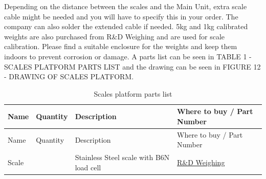 \documentclass[
  letterpaper,
]{scrbook}
\begin{document}
Depending on the distance between the scales and the Main Unit, extra
scale cable might be needed and you will have to specify this in your
order. The company can also solder the extended cable if needed. 5kg and
1kg calibrated weights are also purchased from R\&D Weighing and are
used for scale calibration. Please find a suitable enclosure for the
weights and keep them indoors to prevent corrosion or damage. A parts
list can be seen in TABLE 1 - SCALES PLATFORM PARTS LIST and the drawing
can be seen in FIGURE 12 - DRAWING OF SCALES PLATFORM.

\begin{longtable}[]{@{}
  >{\raggedright\arraybackslash}p{}
  >{\raggedright\arraybackslash}p{}
  >{\raggedright\arraybackslash}p{}
  >{\raggedright\arraybackslash}p{}@{}}
\caption{Scales platform parts
list}\label{tbl-scales-parts}\tabularnewline
\toprule\noalign{}
\begin{minipage}[b]{\linewidth}\raggedright
Name
\end{minipage} & \begin{minipage}[b]{\linewidth}\raggedright
Quantity
\end{minipage} & \begin{minipage}[b]{\linewidth}\raggedright
Description
\end{minipage} & \begin{minipage}[b]{\linewidth}\raggedright
Where to buy / Part Number
\end{minipage} \\
\midrule\noalign{}
\endfirsthead
\toprule\noalign{}
\begin{minipage}[b]{\linewidth}\raggedright
Name
\end{minipage} & \begin{minipage}[b]{\linewidth}\raggedright
Quantity
\end{minipage} & \begin{minipage}[b]{\linewidth}\raggedright
Description
\end{minipage} & \begin{minipage}[b]{\linewidth}\raggedright
Where to buy / Part Number
\end{minipage} \\
\midrule\noalign{}
\endhead
\bottomrule\noalign{}
\endlastfoot
Scale & 2 & Stainless Steel scale with B6N load cell &
\href{https://www.rdweighing.co.za/}{R\&D Weighing} \\

\end{longtable}
\end{document}
